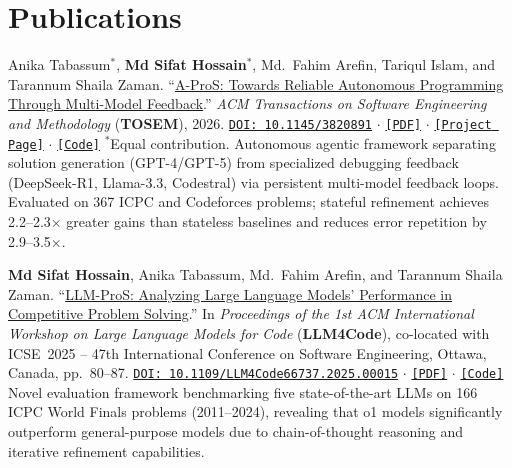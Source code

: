 \documentclass[a4paper,9.5pt]{article}
\begin{document}
\section{Publications}
\begin{enumerate}[leftmargin=0.35in, label={[\arabic*]}, itemsep=6pt]

    \item[{[J1]}] Anika Tabassum$^*$, \textbf{Md Sifat Hossain}$^*$, Md.~Fahim Arefin, Tariqul Islam, and Tarannum Shaila Zaman.
    \newline
    ``\href{https://dl.acm.org/doi/10.1145/3820891}{A-ProS: Towards Reliable Autonomous Programming Through Multi-Model Feedback}.''
    \newline
    \textit{ACM Transactions on Software Engineering and Methodology} (\textbf{TOSEM}), 2026.
    \newline
    {\small \href{https://dl.acm.org/doi/10.1145/3820891}{\texttt{DOI: 10.1145/3820891}} $\cdot$
    \href{https://arxiv.org/abs/2605.18073}{\texttt{[PDF]}} $\cdot$
    \href{https://sifat-hossain-niloy.github.io/A-Pros/}{\texttt{[Project Page]}} $\cdot$
    \href{https://github.com/sifat-hossain-niloy/A-Pros}{\texttt{[Code]}}}
    \newline
    {\small $^*$Equal contribution. Autonomous agentic framework separating solution generation (GPT-4/GPT-5) from specialized debugging feedback (DeepSeek-R1, Llama-3.3, Codestral) via persistent multi-model feedback loops. Evaluated on 367 ICPC and Codeforces problems; stateful refinement achieves 2.2--2.3$\times$ greater gains than stateless baselines and reduces error repetition by 2.9--3.5$\times$.}

    \item[{[C1]}] \textbf{Md Sifat Hossain}, Anika Tabassum, Md.~Fahim Arefin, and Tarannum Shaila Zaman.
    \newline
    ``\href{https://dl.acm.org/doi/10.1109/LLM4Code66737.2025.00015}{LLM-ProS: Analyzing Large Language Models' Performance in Competitive Problem Solving}.''
    \newline
    In \textit{Proceedings of the 1st ACM International Workshop on Large Language Models for Code} (\textbf{LLM4Code}),
    co-located with ICSE~2025 -- 47th International Conference on Software Engineering, Ottawa, Canada, pp.~80--87.
    \newline
    {\small \href{https://ieeexplore.ieee.org/document/11028406}{\texttt{DOI: 10.1109/LLM4Code66737.2025.00015}} $\cdot$
    \href{https://arxiv.org/pdf/2502.04355}{\texttt{[PDF]}} $\cdot$
    \href{https://github.com/sifat-hossain-niloy/Hybrid-Feedback-Loop---LLM}{\texttt{[Code]}}}
    \newline
    {\small Novel evaluation framework benchmarking five state-of-the-art LLMs on 166 ICPC World Finals problems (2011--2024), revealing that o1 models significantly outperform general-purpose models due to chain-of-thought reasoning and iterative refinement capabilities.}


\end{enumerate}
\end{document}
